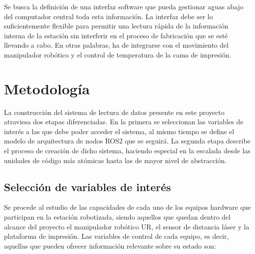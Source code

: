 Se busca la definición de una interfaz software que pueda gestionar aguas abajo del computador central toda esta información. La interfaz debe ser lo suficientemente flexible para permitir una lectura rápida de la información interna de la estación sin interferir en el proceso de fabricación que se esté llevando a cabo. En otras palabras, ha de integrarse con el movimiento del manipulador robótico y el control de temperatura de la cama de impresión.

\section{Metodología}
La construcción del sistema de lectura de datos presente en este proyecto atraviesa dos etapas diferenciadas. En la primera se seleccionan las variables de interés a las que debe poder acceder el sistema, al mismo tiempo se define el modelo de arquitectura de nodos ROS2 que se seguirá. La segunda etapa describe el proceso de creación de dicho sistema, haciendo especial en la escalada desde las unidades de código más atómicas hasta las de mayor nivel de abstracción.

\subsection{Selección de variables de interés}
Se procede al estudio de las capacidades de cada uno de los equipos hardware que participan en la estación robotizada, siendo aquellos que quedan dentro del alcance del proyecto el manipulador robótico UR, el sensor de distancia láser y la plataforma de impresión. Las variables de control de cada equipo, es decir, aquellas que pueden ofrecer información relevante sobre su estado son:

